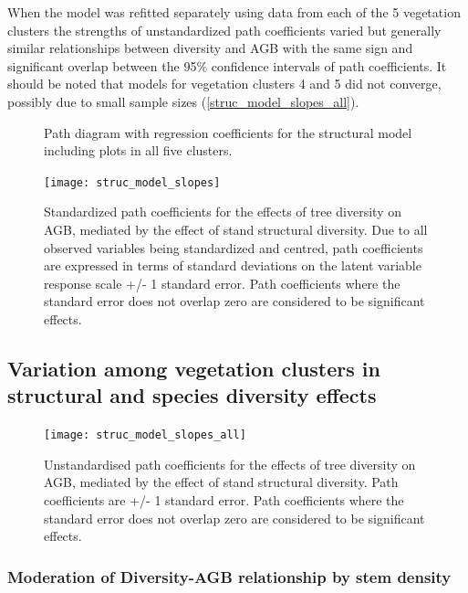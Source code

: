 \documentclass[11pt,a4paper]{article}
\begin{document}
When the model was refitted separately using data from each of the 5 vegetation clusters the strengths of unstandardized path coefficients varied but generally similar relationships between diversity and AGB with the same sign and significant overlap between the 95\% confidence intervals of path coefficients. It should be noted that models for vegetation clusters 4 and 5 did not converge, possibly due to small sample sizes (\autoref{struc_model_slopes_all}).

\begin{figure}[H]
\centering
	
	\caption{Path diagram with regression coefficients for the structural model including plots in all five clusters.}
	\label{struc_mod}
\end{figure}


\begin{figure}[H]
\centering
	\texttt{[image: struc\_model\_slopes]}
	\caption{Standardized path coefficients for the effects of tree diversity on AGB, mediated by the effect of stand structural diversity. Due to all observed variables being standardized and centred, path coefficients are expressed in terms of standard deviations on the latent variable response scale +/- 1 standard error. Path coefficients where the standard error does not overlap zero are considered to be significant effects.}
	\label{struc_model_slopes}
\end{figure}

\subsection{Variation among vegetation clusters in structural and species diversity effects}

\begin{figure}[H]
\centering
	\texttt{[image: struc\_model\_slopes\_all]}
	\caption{Unstandardised path coefficients for the effects of tree diversity on AGB, mediated by the effect of stand structural diversity. Path coefficients are +/- 1 standard error. Path coefficients where the standard error does not overlap zero are considered to be significant effects.}
	\label{struc_model_slopes_all}
\end{figure}




\subsubsection{Moderation of Diversity-AGB relationship by stem density}
\end{document}
